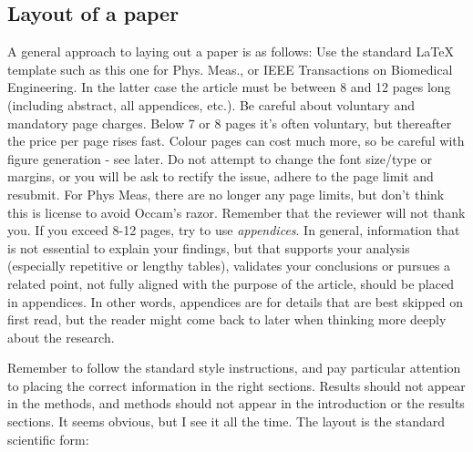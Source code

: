 \subsection{Layout of a paper}
A general approach to laying out a paper is as follows:
Use the standard \LaTeX
template such as this one for Phys. Meas., or IEEE Transactions on Biomedical Engineering. 
In the latter case the article must be between 8 and 12 pages long (including abstract, all appendices, etc.). Be careful about voluntary and mandatory page charges. Below 7 or 8 pages it's often voluntary, but thereafter the price per page rises fast. Colour pages can cost much more, so be careful with figure generation - see later. 
Do not attempt to change the font size/type or margins, or you will be ask to rectify the issue, adhere to the page limit and resubmit. For Phys Meas, there are no longer any page limits, but don't think this is license to avoid Occam's razor. 
Remember that the reviewer will not thank you. If you exceed 8-12 pages, try to use {\it appendices}. In general, information that is not essential to explain your findings, but that supports your analysis (especially repetitive or lengthy tables), validates your conclusions or pursues a related point, not fully aligned with the purpose of the article, should be placed in appendices. In other words, appendices are for details that are best skipped on first read, but the reader might come back to later when thinking more deeply about the research. 
\par
Remember to follow the standard style instructions, and pay particular attention to 
placing the correct information in the right sections. Results should not 
appear in the methods, and methods should not appear in the introduction or
the results sections. It seems obvious, but I see it all the time. The layout is 
the standard scientific form:
